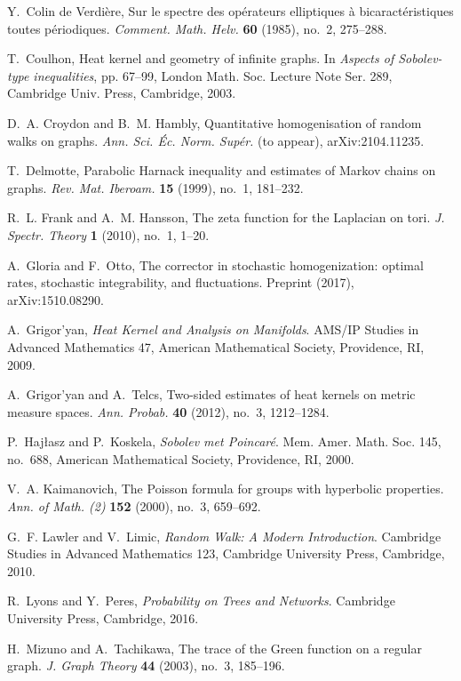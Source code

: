 \documentclass{article}
\numberwithin{equation}{section}
\theoremstyle{definition}
\theoremstyle{remark}
\begin{document}
\begin{thebibliography}{99}
Y.~Colin de Verdière, Sur le spectre des opérateurs elliptiques à bicaractéristiques toutes périodiques.
\emph{Comment. Math. Helv.} \textbf{60} (1985), no.~2, 275--288.

T.~Coulhon, Heat kernel and geometry of infinite graphs.
In \emph{Aspects of Sobolev-type inequalities},
pp. 67--99, London Math. Soc. Lecture Note Ser. 289,
Cambridge Univ. Press, Cambridge, 2003.

D.~A. Croydon and B.~M. Hambly, Quantitative homogenisation of random walks on graphs.
\emph{Ann. Sci. Éc. Norm. Supér.} (to appear), arXiv:2104.11235.

T.~Delmotte, Parabolic Harnack inequality and estimates of Markov chains on graphs.
\emph{Rev. Mat. Iberoam.} \textbf{15} (1999), no.~1, 181--232.

R.~L. Frank and A.~M. Hansson, The zeta function for the Laplacian on tori.
\emph{J. Spectr. Theory} \textbf{1} (2010), no.~1, 1--20.

A.~Gloria and F.~Otto, The corrector in stochastic homogenization: optimal rates, stochastic integrability, and fluctuations.
Preprint (2017), arXiv:1510.08290.

A.~Grigor'yan, \emph{Heat Kernel and Analysis on Manifolds}.
AMS/IP Studies in Advanced Mathematics 47, American Mathematical Society, Providence, RI, 2009.

A.~Grigor'yan and A.~Telcs, Two-sided estimates of heat kernels on metric measure spaces.
\emph{Ann. Probab.} \textbf{40} (2012), no.~3, 1212--1284.

P.~Hajłasz and P.~Koskela, \emph{Sobolev met Poincaré}.
Mem. Amer. Math. Soc. 145, no.~688, American Mathematical Society, Providence, RI, 2000.

V.~A. Kaimanovich, The Poisson formula for groups with hyperbolic properties.
\emph{Ann. of Math. (2)} \textbf{152} (2000), no.~3, 659--692.

G.~F. Lawler and V.~Limic, \emph{Random Walk: A Modern Introduction}.
Cambridge Studies in Advanced Mathematics 123, Cambridge University Press, Cambridge, 2010.

R.~Lyons and Y.~Peres, \emph{Probability on Trees and Networks}.
Cambridge University Press, Cambridge, 2016.

H.~Mizuno and A.~Tachikawa, The trace of the Green function on a regular graph.
\emph{J. Graph Theory} \textbf{44} (2003), no.~3, 185--196.

\end{thebibliography}
\end{document}
